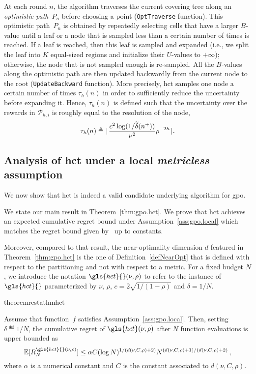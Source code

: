 At each round $n$, the algorithm traverses the current covering tree along an \emph{optimistic path}~$P_n$ before choosing a point (\texttt{OptTraverse} function). This optimistic path~$P_n$ is obtained by repeatedly selecting cells that have a larger $B$-value until a leaf or a node that is sampled less than a certain number of times is reached. If a leaf is reached, then this leaf is sampled and expanded (i.e., we split the leaf into $K$ equal-sized regions and initialize their $U$-values to $+\infty$); otherwise, the node that is not sampled enough is re-sampled. All the $B$-values along the optimistic path are then updated backwardly from the current node to the root (\texttt{UpdateBackward} function). More precisely, \gls{hct}{} samples one node a certain number of times $\tau_h(n)$ in order to sufficiently reduce the uncertainty before expanding it. Hence, $\tau_h(n)$ is defined such that the uncertainty over the rewards in $\mathcal{P}_{h,i}$ is roughly equal to the resolution of the node,
\[
	\tau_h(n) \triangleq \lceil\frac{c^2\operatorname{log}(1/\widetilde{\delta}(n^+))}{\nu^2}\rho^{-2h}\rceil.
\]

\subsection{Analysis of \gls{hct} \textbf{under a local \emph{metricless} assumption}}\label{sec:gpo.analysis}

We now show that \gls{hct} is indeed a valid candidate underlying algorithm for \gls{gpo}. 

We state our main result in Theorem~\ref{thm:gpo.hct}. We prove that \gls{hct} achieves an expected cumulative regret bound under Assumption~\ref{ass:gpo.local} which matches the regret bound given by~\cite{azar2014online} up to constants.

Moreover, compared to that result, the \gls{near-optimality dimension} $d$ featured in Theorem~\ref{thm:gpo.hct} is the one of Definition~\ref{defNearOpt} that is defined with respect to the partitioning and not with respect to a metric. For a fixed budget $N$, we introduce the notation $\gls{hct}{}(\nu,\rho)$ to refer to the instance of $\gls{hct}{}$ parameterized by $\nu$, $\rho$, $c=2\sqrt{1/(1-\rho)}$ and $\delta = 1/N$.

\begin{restatable}{theorem}{restathmhct}\label{thm:gpo.hct}
\begin{leftbar}[theorembar]
	Assume that function~$f$ satisfies Assumption~\ref{ass:gpo.local}. Then, setting $\delta \eqdef 1/N$, the cumulative regret of ${\gls{hct}}(\nu,\rho)$ after $N$ function evaluations is upper bounded as 
\[
	\mathbb{E}[R_N^{\gls{hct}{}(\nu,\rho)}] \leq \alpha C (\log N)^{1/(d(\nu,C,\rho)+2)}N^{(d(\nu,C,\rho)+1)/(d(\nu,C,\rho)+2)}\,,
\]
where $\alpha$ is a numerical constant and $C$ is the constant associated to $d(\nu,C,\rho)$.
\end{leftbar}
\end{restatable}

